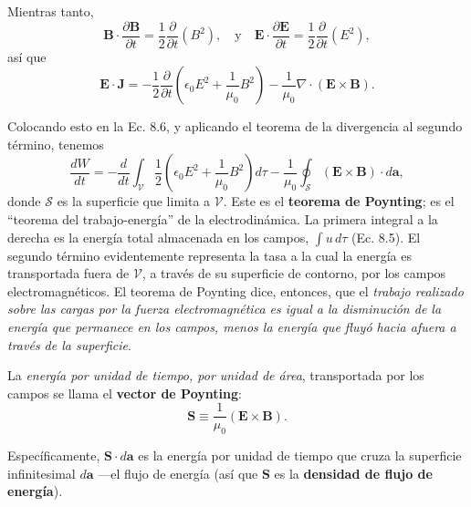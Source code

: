 \documentclass[12pt,a4paper]{report}
\newcommand{\esp}{\vspace{0.5cm}}
\begin{document}
	Mientras tanto,
	\begin{equation}
		\mathbf{B} \cdot \frac{\partial \mathbf{B}}{\partial t} = \frac{1}{2} \frac{\partial}{\partial t} (B^2), \quad \text{y} \quad \mathbf{E} \cdot \frac{\partial \mathbf{E}}{\partial t} = \frac{1}{2} \frac{\partial}{\partial t} (E^2), \tag{8.7}
	\end{equation}
	así que
	\begin{equation}
		\mathbf{E} \cdot \mathbf{J} = -\frac{1}{2} \frac{\partial}{\partial t} \left( \epsilon_0 E^2 + \frac{1}{\mu_0} B^2 \right) - \frac{1}{\mu_0} \nabla \cdot (\mathbf{E} \times \mathbf{B}). \tag{8.8}
	\end{equation}
	
	Colocando esto en la Ec. 8.6, y aplicando el teorema de la divergencia al segundo término, tenemos
	\begin{equation}
		\frac{dW}{dt} = -\frac{d}{dt} \int_{\mathcal{V}} \frac{1}{2} \left( \epsilon_0 E^2 + \frac{1}{\mu_0} B^2 \right) d\tau - \frac{1}{\mu_0} \oint_{\mathcal{S}} (\mathbf{E} \times \mathbf{B}) \cdot d\mathbf{a}, \tag{8.9}
	\end{equation}
	donde $\mathcal{S}$ es la superficie que limita a $\mathcal{V}$. Este es el \textbf{teorema de Poynting}; es el ``teorema del trabajo-energía'' de la electrodinámica. La primera integral a la derecha es la energía total almacenada en los campos, $\int u \, d\tau$ (Ec. 8.5). El segundo término evidentemente representa la tasa a la cual la energía es transportada fuera de $\mathcal{V}$, a través de su superficie de contorno, por los campos electromagnéticos. El teorema de Poynting dice, entonces, que el \textit{trabajo realizado sobre las cargas por la fuerza electromagnética es igual a la disminución de la energía que permanece en los campos, menos la energía que fluyó hacia afuera a través de la superficie}.
	
	La \textit{energía por unidad de tiempo, por unidad de área}, transportada por los campos se llama el \textbf{vector de Poynting}:
	\begin{equation}
		\mathbf{S} \equiv \frac{1}{\mu_0} (\mathbf{E} \times \mathbf{B}). \tag{8.10}
	\end{equation}
	
	Específicamente, $\mathbf{S} \cdot d\mathbf{a}$ es la energía por unidad de tiempo que cruza la superficie infinitesimal $d\mathbf{a}$ ---el flujo de energía (así que $\mathbf{S}$ es la \textbf{densidad de flujo de energía}).
	
	\esp
	
\end{document}
